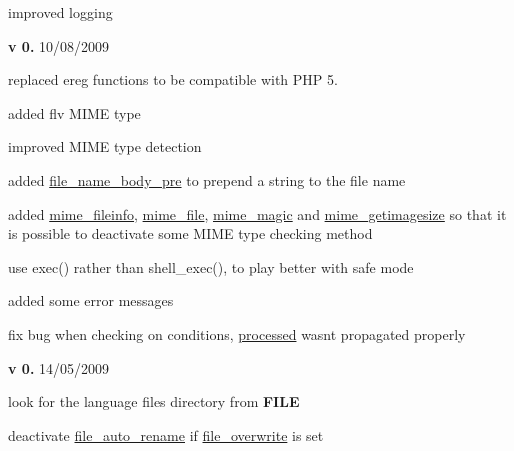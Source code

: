 \begin{DoxyItemize}
\begin{DoxyItemize}
\item improved logging 
\end{DoxyItemize}
\item {\bfseries v 0.} 10/08/2009~\newline

\begin{DoxyItemize}
\item replaced ereg functions to be compatible with P\+H\+P 5.~\newline

\item added flv M\+I\+M\+E type~\newline

\item improved M\+I\+M\+E type detection~\newline

\item added \hyperlink{}{file\+\_\+name\+\_\+body\+\_\+pre} to prepend a string to the file name~\newline

\item added \hyperlink{}{mime\+\_\+fileinfo}, \hyperlink{}{mime\+\_\+file}, \hyperlink{}{mime\+\_\+magic} and \hyperlink{}{mime\+\_\+getimagesize} so that it is possible to deactivate some M\+I\+M\+E type checking method~\newline

\item use exec() rather than shell\+\_\+exec(), to play better with safe mode ~\newline

\item added some error messages~\newline

\item fix bug when checking on conditions, \hyperlink{}{processed} wasn\textquotesingle{}t propagated properly 
\end{DoxyItemize}
\item {\bfseries v 0.} 14/05/2009~\newline

\begin{DoxyItemize}
\item look for the language files directory from {\bfseries F\+I\+L\+E}~\newline

\item deactivate \hyperlink{}{file\+\_\+auto\+\_\+rename} if \hyperlink{}{file\+\_\+overwrite} is set~\newline


\end{DoxyItemize}
\end{DoxyItemize}
